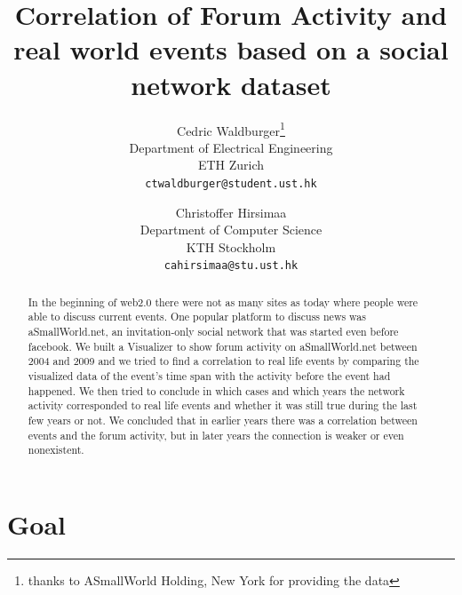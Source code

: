 \documentclass[11pt,a4paper,english]{article}
\title{Correlation of Forum Activity and real world events based on a social network dataset}
\author{%
  Cedric Waldburger\thanks{thanks to ASmallWorld Holding, New York for providing the data}\\
  \small Department of Electrical Engineering\\
  \small ETH Zurich \\
  \small\texttt{ctwaldburger@student.ust.hk}
  \and
  Christoffer Hirsimaa\\
  \small Department of Computer Science\\
  \small KTH Stockholm\\
  \small\texttt{cahirsimaa@stu.ust.hk}
}
\begin{document}
  \maketitle

  \begin{abstract}
  	In the beginning of web2.0 there were not as many sites as today where people were able to discuss current events. One popular platform to discuss news was aSmallWorld.net, an invitation-only social network that was started even before facebook. We built a Visualizer to show forum activity on aSmallWorld.net between 2004 and 2009 and we tried to find a correlation to real life events by comparing the visualized data of the event's time span with the activity before the event had happened. We then tried to conclude in which cases and which years the network activity corresponded to real life events and whether it was still true during the last few years or not. We concluded that in earlier years there was a correlation between events and the forum activity, but in later years the connection is weaker or even nonexistent.
  \end{abstract}
  \newpage

  \tableofcontents\newpage

	\section{Goal}
\end{document}
